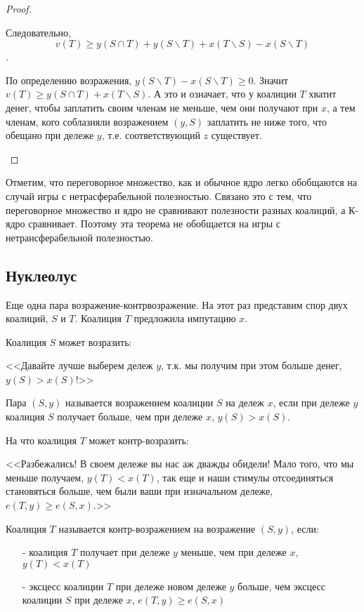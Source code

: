 \begin{proof}
\begin{itemize}
Следовательно, 
\begin{equation}
v(T)\geq y(S\cap T)+y(S\backslash T)+x(T\backslash S)-x(S\backslash T)
\end{equation}. 

По определению возражения, $y(S\backslash T)-x(S\backslash T)\geq 0$. Значит $v(T)\geq y(S\cap T) + x(T\backslash S)$. А это и означает, что у коалиции $T$ хватит денег, чтобы заплатить своим членам не меньше, чем они получают при $x$, а тем членам, кого соблазняли возражением $(y,S)$ заплатить не ниже того, что обещано при дележе $y$, т.е. соответствующий $z$ существует.
\end{itemize}


\end{proof}

Отметим, что переговорное множество, как и обычное ядро легко обобщаются на случай игры с нетрасферабельной полезностью. Связано это с тем, что переговорное множество и ядро не сравнивают полезности разных коалиций, а К-ядро сравнивает. Поэтому эта теорема не обобщается на игры с нетрансферабельной полезностью. 

\subsection{Нуклеолус}

Еще одна пара возражение-контрвозражение. На этот раз представим спор двух коалиций, $S$ и $T$. Коалиция $T$ предложила импутацию $x$.

Коалиция $S$ может возразить:

<<Давайте лучше выберем дележ $y$, т.к. мы получим при этом больше денег, $y(S)>x(S)$!>>
\begin{mydef}
Пара $(S,y)$ называется возражением коалиции $S$ на дележ $x$, если при дележе $y$ коалиция $S$ получает больше, чем при дележе $x$, $y(S)>x(S)$.
\end{mydef}

На что коалиция $T$ может контр-возразить:

<<Разбежались! В своем дележе вы нас аж дважды обидели! Мало того, что мы меньше получаем, $y(T)<x(T)$, так еще и наши стимулы отсоединяться становяться больше, чем были ваши при изначальном дележе, $e(T,y)\geq e(S,x)$.>>
\begin{mydef}
Коалиция $T$ называется контр-возражением на возражение $(S,y)$, если:
\begin{itemize}
\item[-] коалиция $T$ получает при дележе $y$ меньше, чем при дележе $x$, $y(T)<x(T)$
\item[-] эксцесс коалиции $T$ при дележе новом дележе $y$ больше, чем эксцесс коалиции $S$ при дележе $x$, $e(T,y)\geq e(S,x)$
\end{itemize}
\end{mydef}


